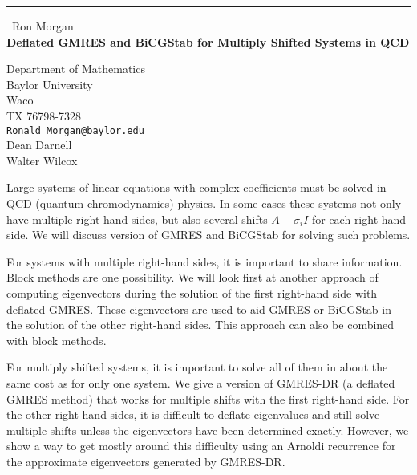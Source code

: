 \documentclass{report}
\begin{document}
\begin{center}
\rule{6in}{1pt} \
{\large Ron Morgan \\
{\bf Deflated GMRES and BiCGStab for Multiply Shifted Systems in QCD}}

Department of Mathematics \\ Baylor University \\ Waco \\ TX  76798-7328
\\
{\tt Ronald\_Morgan@baylor.edu}\\
Dean Darnell\\
Walter Wilcox\end{center}

Large systems of linear equations with complex coefficients must be
solved in QCD (quantum chromodynamics) physics. In some cases these
systems not only have multiple right-hand sides, but also several shifts
$A-\sigma_i I$ for each right-hand side. We will discuss version of GMRES
and BiCGStab for solving such problems.

For systems with multiple right-hand sides, it is important to share
information. Block methods are one possibility. We will look first at
another approach of computing eigenvectors during the solution of the
first right-hand side with deflated GMRES. These eigenvectors are used to
aid GMRES or BiCGStab in the solution of the other right-hand sides. This
approach can also be combined with block methods.

For multiply shifted systems, it is important to solve all of them in
about the same cost as for only one system. We give a version of GMRES-DR
(a deflated GMRES method) that works for multiple shifts with the first
right-hand side. For the other right-hand sides, it is difficult to
deflate eigenvalues and still solve multiple shifts unless the
eigenvectors have been determined exactly. However, we show a way to get
mostly around this difficulty using an Arnoldi recurrence for the
approximate eigenvectors generated by GMRES-DR.
\end{document}
